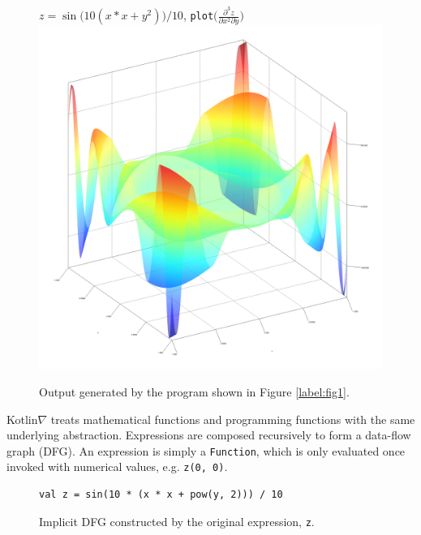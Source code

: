 \documentclass[12pt,initial,twoside,maitrise]{dms}
\numberwithin{equation}{section}
\numberwithin{table}{chapter}
\numberwithin{figure}{chapter}
\begin{document}
\begin{figure}[!htb]
\centering $z = \sin{\big(10(x*x + y^2)\big)} / 10$, \texttt{plot}$\Big(\frac{\partial^3z}{\partial{x^2}\partial{y}}\Big)$
\includegraphics[scale=0.43]{plot_result.png}
\caption{Output generated by the program shown in Figure \ref{label:fig1}.}
\end{figure}

Kotlin$\nabla$ treats mathematical functions and programming functions with the same underlying abstraction. Expressions are composed recursively to form a data-flow graph (DFG). An expression is simply a \texttt{Function}, which is only evaluated once invoked with numerical values, e.g. \texttt{z(0, 0)}.

\begin{figure}[!htb]
\begin{verbatim}
val z = sin(10 * (x * x + pow(y, 2))) / 10
\end{verbatim}
\centering
{}
\caption{Implicit DFG constructed by the original expression, \texttt{z}.}
\end{figure}
\end{document}
